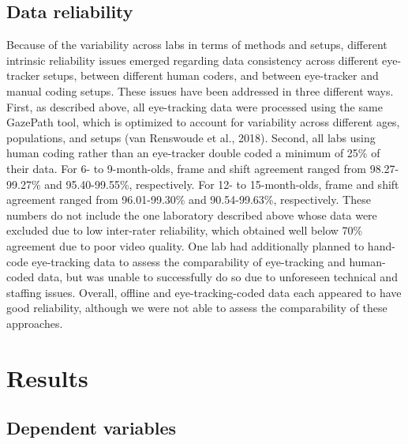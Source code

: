 \documentclass[,man,floatsintext]{apa6}
\begin{document}
\hypertarget{data-reliability}{%
\subsection{Data reliability}\label{data-reliability}}

Because of the variability across labs in terms of methods and setups, different intrinsic reliability issues emerged regarding data consistency across different eye-tracker setups, between different human coders, and between eye-tracker and manual coding setups. These issues have been addressed in three different ways. First, as described above, all eye-tracking data were processed using the same GazePath tool, which is optimized to account for variability across different ages, populations, and setups (van Renswoude et al., 2018). Second, all labs using human coding rather than an eye-tracker double coded a minimum of 25\% of their data. For 6- to 9-month-olds, frame and shift agreement ranged from 98.27-99.27\% and 95.40-99.55\%, respectively. For 12- to 15-month-olds, frame and shift agreement ranged from 96.01-99.30\% and 90.54-99.63\%, respectively. These numbers do not include the one laboratory described above whose data were excluded due to low inter-rater reliability, which obtained well below 70\% agreement due to poor video quality. One lab had additionally planned to hand-code eye-tracking data to assess the comparability of eye-tracking and human-coded data, but was unable to successfully do so due to unforeseen technical and staffing issues. Overall, offline and eye-tracking-coded data each appeared to have good reliability, although we were not able to assess the comparability of these approaches.

\hypertarget{results}{%
\section{Results}\label{results}}

\hypertarget{dependent-variables}{%
\subsection{Dependent variables}\label{dependent-variables}}
\end{document}
